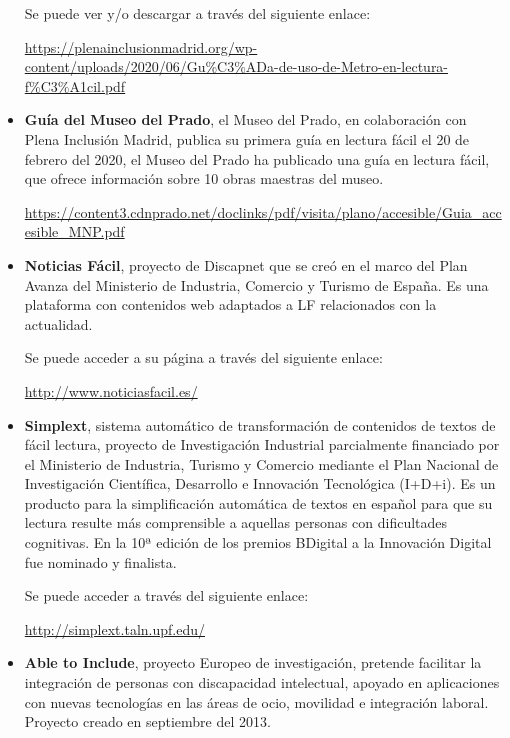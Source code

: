 \begin{itemize}
Se puede ver y/o descargar a través del siguiente enlace:


\href{https://plenainclusionmadrid.org/wp-content/uploads/2020/06/Gu\%C3\%ADa-de-uso-de-Metro-en-lectura-f\%C3\%A1cil.pdf}{https://plenainclusionmadrid.org/wp-content/uploads/2020/06/Gu\%C3\%ADa-de-uso-de-Metro-en-lectura-f\%C3\%A1cil.pdf}

\item
{\textbf{Guía del Museo del Prado}}, el Museo del Prado, en colaboración con Plena Inclusión Madrid, publica su primera guía en lectura fácil el 20 de febrero del 2020, el Museo del Prado ha publicado una guía en lectura fácil, que ofrece información sobre 10 obras maestras del museo.

\href{https://content3.cdnprado.net/doclinks/pdf/visita/plano/accesible/Guia\_accesible\_MNP.pdf}{https://content3.cdnprado.net/doclinks/pdf/visita/plano/accesible/Guia\_accesible\_MNP.pdf}


\item
{\textbf{Noticias Fácil}}, proyecto de Discapnet que se creó en el marco del Plan Avanza del Ministerio de Industria, Comercio y Turismo de España. Es una plataforma con contenidos web adaptados a LF relacionados con la actualidad. 

Se puede acceder a su página a través del siguiente enlace:

\href{http://www.noticiasfacil.es/}{http://www.noticiasfacil.es/}

\item
{\textbf{Simplext}}, sistema automático de transformación de contenidos de textos de fácil lectura, proyecto de Investigación Industrial parcialmente financiado por el Ministerio de Industria, Turismo y Comercio mediante el Plan Nacional de Investigación Científica, Desarrollo e Innovación Tecnológica (I+D+i). Es un producto para la simplificación automática de textos en español para que su lectura resulte más comprensible a aquellas personas con dificultades cognitivas. En la 10ª edición de los premios BDigital a la Innovación Digital fue nominado y finalista.

Se puede acceder a través del siguiente enlace:
 
\href{http://simplext.taln.upf.edu/}{http://simplext.taln.upf.edu/}

\item
{\textbf{Able to Include}}, proyecto Europeo de investigación, pretende facilitar la integración de personas con discapacidad intelectual, apoyado en aplicaciones con nuevas tecnologías en las áreas de ocio, movilidad e integración laboral. Proyecto creado en septiembre del 2013.


\end{itemize}
